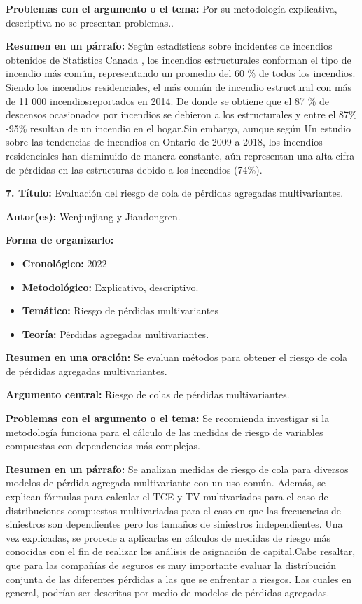 \documentclass[
  oneside]{memoir}
\begin{document}
\textbf{Problemas con el argumento o el tema:} Por su metodología
explicativa, descriptiva no se presentan problemas..

\textbf{Resumen en un párrafo:} Según estadísticas sobre incidentes de
incendios obtenidos de Statistics Canada , los incendios estructurales
conforman el tipo de incendio más común, representando un promedio del
60 \% de todos los incendios. Siendo los incendios residenciales, el más
común de incendio estructural con más de 11 000 incendiosreportados en
2014. De donde se obtiene que el 87 \% de descensos ocasionados por
incendios se debieron a los estructurales y entre el 87\% -95\% resultan
de un incendio en el hogar.Sin embargo, aunque según Un estudio sobre
las tendencias de incendios en Ontario de 2009 a 2018, los incendios
residenciales han disminuido de manera constante, aún representan una
alta cifra de pérdidas en las estructuras debido a los incendios (74\%).

\textbf{ 7. Título:} Evaluación del riesgo de cola de pérdidas agregadas
multivariantes.

\textbf{Autor(es):} Wenjunjiang y Jiandongren.

\textbf{Forma de organizarlo:}

\begin{itemize}

\item \textbf{Cronológico:} 2022

\item \textbf{Metodológico:} Explicativo, descriptivo.

\item \textbf{Temático:} Riesgo de pérdidas multivariantes

\item \textbf{Teoría:} Pérdidas agregadas multivariantes.
\end{itemize}

\textbf{Resumen en una oración:} Se evaluan métodos para obtener el
riesgo de cola de pérdidas agregadas multivariantes.

\textbf{Argumento central:} Riesgo de colas de pérdidas multivariantes.

\textbf{Problemas con el argumento o el tema:} Se recomienda investigar
si la metodología funciona para el cálculo de las medidas de riesgo de
variables compuestas con dependencias más complejas.

\textbf{Resumen en un párrafo:} Se analizan medidas de riesgo de cola
para diversos modelos de pérdida agregada multivariante con un uso
común. Además, se explican fórmulas para calcular el TCE y TV
multivariados para el caso de distribuciones compuestas multivariadas
para el caso en que las frecuencias de siniestros son dependientes pero
los tamaños de siniestros independientes. Una vez explicadas, se procede
a aplicarlas en cálculos de medidas de riesgo más conocidas con el fin
de realizar los análisis de asignación de capital.Cabe resaltar, que
para las compañías de seguros es muy importante evaluar la distribución
conjunta de las diferentes pérdidas a las que se enfrentar a riesgos.
Las cuales en general, podrían ser descritas por medio de modelos de
pérdidas agregadas.
\end{document}
